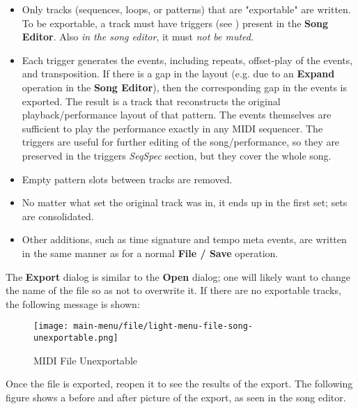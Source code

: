    \begin{itemize}
      \item Only tracks (sequences, loops, or patterns)
         that are "exportable" are written.  To be exportable, a
         track must have triggers
         (see )
         present in the \textbf{Song Editor}.
         Also \textsl{in the song editor}, it must \textsl{not be muted}.
      \item Each trigger generates the events, including repeats,
         offset-play of the events, and transposition.
         If there is a gap in the layout
         (e.g. due to an \textbf{Expand} operation in the
         \textbf{Song Editor}),
         then the corresponding gap in the events is exported.
         The result is a track that reconstructs the original
         playback/performance layout of that pattern.
         The events themselves are sufficient to play the performance exactly
         in any MIDI sequencer.
         The triggers are useful for further editing of the song/performance,
         so they are preserved in the triggers \textsl{SeqSpec} section, but
         they cover the whole song.
      \item Empty pattern slots between tracks are removed.
      \item No matter what set the original track was in, it ends up in the
         first set; sets are consolidated.
      \item Other additions, such as time signature and tempo meta events, are
         written in the same manner as for a normal \textbf{File / Save}
         operation.
   \end{itemize}

   The \textbf{Export} dialog is similar to the \textbf{Open} dialog;
   one will likely want to change the name of the file so as
   not to overwrite it.
   If there are no exportable tracks, the following message is shown:

\begin{figure}[H]
   \centering 
   \texttt{[image: main-menu/file/light-menu-file-song-unexportable.png]}
   \caption{MIDI File Unexportable}
   \label{fig:midi_export_file_unexportable}
\end{figure}

   Once the file is exported, reopen it to see the results of the export.
   The following figure shows a before and after picture of the export, as
   seen in the song editor.

